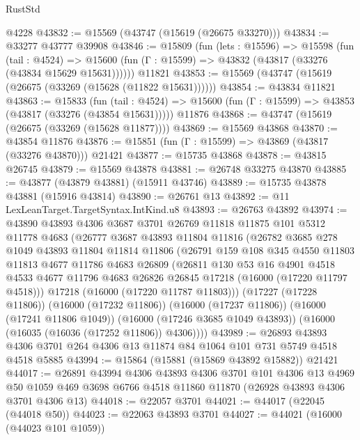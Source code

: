 \begin{lexlean}{RustStd}
\begin{coremodule}
    @4228
@43832 := @15569 (@43747 (@15619 (@26675 @33270)))
@43834 := @33277 @43777 @39908
@43846 := @15809
    (fun (lets : @15596) =>
    @15598
      (fun (tail : @4524) =>
      @15600 (fun (Γ : @15599) => @43832 (@43817 (@33276 (@43834 @15629 @15631))))))
    @11821
@43853 := @15569 (@43747 (@15619 (@26675 (@33269 (@15628 (@11822 @15631))))))
@43854 := @43834 @11821
@43863 := @15833
    (fun (tail : @4524) => @15600 (fun (Γ : @15599) => @43853 (@43817 (@33276 (@43854 @15631)))))
    @11876
@43868 := @43747 (@15619 (@26675 (@33269 (@15628 @11877))))
@43869 := @15569 @43868
@43870 := @43854 @11876
@43876 := @15851 (fun (Γ : @15599) => @43869 (@43817 (@33276 @43870))) @21421
@43877 := @15735 @43868
@43878 := @43815 @26745
@43879 := @15569 @43878
@43881 := @26748 @33275 @43870
@43885 := @43877 (@43879 @43881) (@15911 @43746)
@43889 := @15735 @43878 @43881 (@15916 @43814)
@43890 := @26761 @13
@43892 := @11 LexLeanTarget.TargetSyntax.IntKind.u8
@43893 := @26763 @43892
@43974 := @43890
    @43893
    @4306
    @3687
    @3701
    @26769
    @11818
    @11875
    @101
    @5312
    @11778
    @4683
    (@26777
      @3687
      @43893
      @11804
      @11816
      (@26782
        @3685
        @278
        @1049
        @43893
        @11804
        @11814
        @11806
        (@26791
          @159
          @108
          @345
          @4550
          @11803
          @11813
          @4677
          @11786
          @4683
          @26809
          (@26811
            @130
            @53
            @16
            @4901
            @4518
            @4533
            @4677
            @11796
            @4683
            @26826
            @26845
            @17218
            (@16000 (@17220 @11797 @4518)))
          @17218
          (@16000 (@17220 @11787 @11803)))
        (@17227 (@17228 @11806))
        (@16000 (@17232 @11806))
        (@16000 (@17237 @11806))
        (@16000 (@17241 @11806 @1049))
        (@16000 (@17246 @3685 @1049 @43893))
        (@16000 (@16035 (@16036 (@17252 @11806)) @4306))))
@43989 := @26893
    @43893
    @4306
    @3701
    @264
    @4306
    @13
    @11874
    @84
    @1064
    @101
    @731
    @5749
    @4518
    @4518
    @5885
@43994 := @15864 (@15881 (@15869 @43892 @15882)) @21421
@44017 := @26891
    @43994
    @4306
    @43893
    @4306
    @3701
    @101
    @4306
    @13
    @4969
    @50
    @1059
    @469
    @3698
    @6766
    @4518
    @11860
    @11870
    (@26928 @43893 @4306 @3701 @4306 @13)
@44018 := @22057 @3701
@44021 := @44017 (@22045 (@44018 @50))
@44023 := @22063 @43893 @3701
@44027 := @44021 (@16000 (@44023 @101 @1059))

\end{coremodule}
\end{lexlean}
